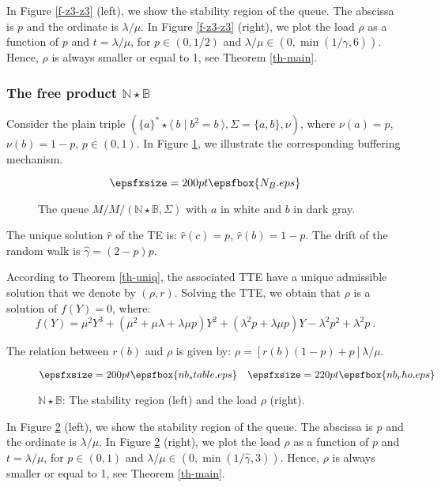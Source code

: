 \documentclass[11pt,a4paper]{article}
\theoremstyle{remark}
\def\Blackboardfont{\mathbb}
\newcommand{\pres}[2]{\langle \: #1 \mid #2 \: \rangle}
\def\B{{\Blackboardfont B}}
\def\N{{\Blackboardfont N}}
\begin{document}
In Figure \ref{f-z3-z3} (left), we show the stability region of
the queue. The abscissa is $p$ and the ordinate is $\lambda/\mu$.
In Figure \ref{f-z3-z3} (right), we plot the load $\rho$ as a
function of $p$ and $t=\lambda/\mu$, for $p\in (0,1/2)$ and
$\lambda/\mu \in( 0,\min(1/\widehat{\gamma},6))$. Hence, $\rho$
is always smaller or equal to 1, see Theorem \ref{th-main}.

\subsubsection{The free product $\N \star \mathbb{B}$}

Consider the plain triple $(\{a\}^* \star
\pres{b}{b^2=b},\Sigma=\{a,b\}, \nu)$, where $\nu(a)=p$,
$\nu(b)=1-p$, $p\in (0,1)$. In Figure \ref{f-n-b}, we illustrate
the corresponding buffering mechanism.

\begin{figure}[ht]
\[ \epsfxsize=200pt \epsfbox{N_B.eps} \]
\caption{The queue $M/M/(\N\star \B,\Sigma)$ with $a$ in white and
$b$ in dark gray.} \label{f-n-b}
\end{figure}

The unique solution $\hat{r}$ of the TE is:
$\widehat{r}(c)=p $, $ \widehat{r}(b)=1-p.$ The drift of the
random walk is $\widehat{\gamma}=(2-p)p$.

According to Theorem \ref{th-uniq}, the associated TTE have a
unique admissible solution that we denote by $(\rho,r)$. Solving
the TTE, we obtain that $\rho$ is a solution of $f(Y)=0$, where:
\begin{equation*}\label{eq_rho_n-b}
f(Y)=\mu^2 Y^3+(\mu^2+\mu\lambda+\lambda\mu p)Y^2+(\lambda^2
p+\lambda\mu p)Y-\lambda^2 p^2+\lambda^2 p \:.
\end{equation*}

The relation between $r(b)$ and $\rho$ is given by: $
\rho=[r(b)(1-p)+p]\lambda/\mu$.

\begin{figure}[ht]
\[ \epsfxsize=200pt \epsfbox{nb_stable.eps} \quad \epsfxsize=220pt \epsfbox{nb_rho.eps} \]
\caption{$\N \star \mathbb{B}$: The stability region (left) and
the load $\rho$ (right).} \label{f-n-b-stab}
\end{figure}


In Figure \ref{f-n-b-stab} (left), we show the stability region of
the queue. The abscissa is $p$ and the ordinate is $\lambda/\mu$.
In Figure \ref{f-n-b-stab} (right), we plot the load $\rho$ as a
function of $p$ and $t=\lambda/\mu$, for $p\in (0,1)$ and
$\lambda/\mu \in( 0,\min(1/\widehat{\gamma},3))$. Hence, $\rho$ is
always smaller or equal to 1, see Theorem \ref{th-main}.
\end{document}
